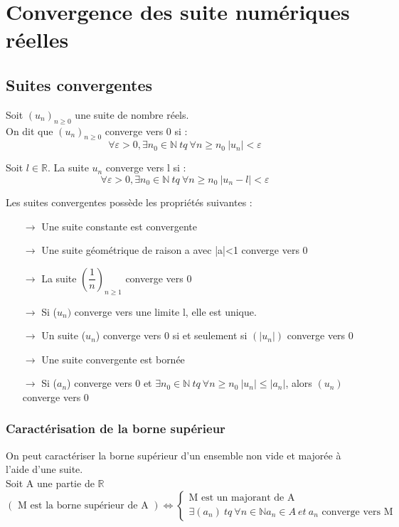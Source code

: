 \chapter{Convergence des suite numériques réelles}
\section{Suites convergentes}
\begin{de}
Soit $(u_n)_{n \geq 0}$ une suite de nombre réels.\\
On dit que $(u_n)_{n \geq 0}$ converge vers 0 si :
$$\forall \varepsilon > 0, \exists n_0 \in \mathbb{N}~ tq~ \forall n \geq n_0~ |u_n|<\varepsilon$$
\end{de}
\begin{de}
Soit $l \in \mathbb{R}$. La suite $u_n$ converge vers l si :
$$\forall \varepsilon > 0, \exists n_0 \in \mathbb{N}~ tq~ \forall n \geq n_0~ |u_n -l|<\varepsilon$$
\end{de}
Les suites convergentes possède les propriétés suivantes :\\
\begin{itemize}
 \item[$\rightarrow$] Une suite constante est convergente\\
 \item[$\rightarrow$] Une suite géométrique de raison a avec |a|<1 converge vers 0\\
 \item[$\rightarrow$] La suite $(\dfrac{1}{n})_{n\geq 1}$ converge vers 0\\
 \item[$\rightarrow$] Si ($u_n)$ converge vers une limite l, elle est unique.\\
 \item[$\rightarrow$] Un suite ($u_n$) converge vers 0 si et seulement si $(|u_n|)$ converge vers 0\\
 \item[$\rightarrow$] Une suite convergente est bornée\\
 \item[$\rightarrow$] Si ($a_n$) converge vers 0 et $\exists n_0 \in \mathbb{N}~ tq~ \forall n \geq n_0~ |u_n|\leq |a_n|$, alors $(u_n)$ converge vers 0\\
\end{itemize}
\subsection{Caractérisation de la borne supérieur}
On peut caractériser la borne supérieur d'un ensemble non vide et majorée à l'aide d'une suite.\\
Soit A une partie de $\mathbb{R}$
$$(\mbox{ M est la borne supérieur de A }) \Leftrightarrow \left\{\begin{array}{l}
    \mbox{M est un majorant de A}\\
    \exists(a_n)~ tq~ \forall n \in \mathbb{N} a_n\in A~ et~ a_n\mbox{ converge vers M}
  \end{array}\right.$$
